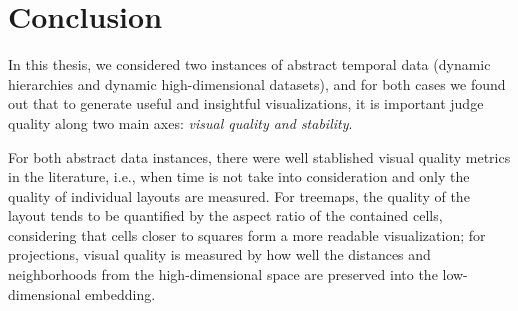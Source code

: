 \chapter{Conclusion}






In this thesis, we considered two instances of abstract temporal data (dynamic hierarchies and dynamic high-dimensional datasets), and for both cases we found out that to generate useful and insightful visualizations, it is important judge quality along two main axes: \emph{visual quality and stability}. 

For both abstract data instances, there were well stablished visual quality metrics in the literature, i.e., when time is not take into consideration and only the quality of individual layouts are measured. For treemaps, the quality of the layout tends to be quantified by the aspect ratio of the contained cells, considering that cells closer to squares form a more readable visualization; for projections, visual quality is measured by how well the distances and neighborhoods from the high-dimensional space are preserved into the low-dimensional embedding.


